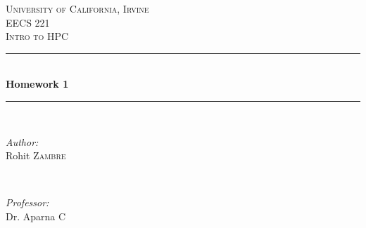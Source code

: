 \documentclass[12pt]{article}
\newcommand{\HRule}{\rule{\linewidth}{0.5mm}} %
\begin{document}
\begin{titlepage}

\center %


\textsc{\LARGE University of California, Irvine}\\[1.5cm] %
\textsc{\Large EECS 221}\\[0.5cm] %
\textsc{\large Intro to HPC}\\[0.5cm] %


\HRule \\[0.4cm]
{ \huge \bfseries Homework 1}\\[0.4cm] %
\HRule \\[1.5cm]


\begin{minipage}{0.4\textwidth}
	\begin{flushleft} \large
		\emph{Author:}\\
		Rohit \textsc{Zambre} %
	\end{flushleft}
\end{minipage}
~
\begin{minipage}{0.4\textwidth}
	\begin{flushright} \large
		\emph{Professor:} \\
		Dr. Aparna \textsc{C} %
	\end{flushright}
\end{minipage}\\[2cm]



\end{titlepage}
\end{document}
